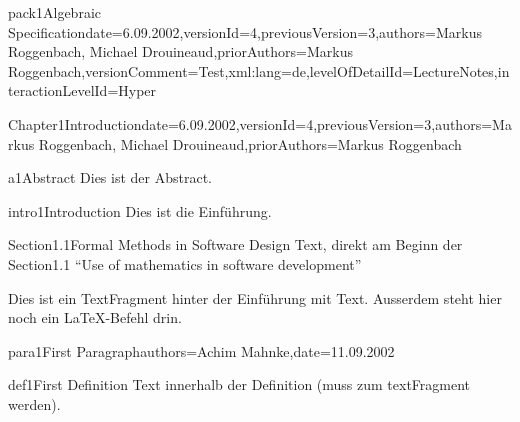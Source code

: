 \documentclass[landscape, slides, light]{mmiss2}
\begin{document}
\begin{Package}{pack1}{Algebraic
Specification}{date=6.09.2002,versionId=4,previousVersion=3,authors={Markus
Roggenbach, Michael Drouineaud},priorAuthors={Markus
Roggenbach},versionComment=Test,xml:lang=de,levelOfDetailId=LectureNotes,interactionLevelId=Hyper}


\begin{Section}{Chapter1}{Introduction}{date=6.09.2002,versionId=4,previousVersion=3,authors={Markus
Roggenbach, Michael Drouineaud},priorAuthors={Markus Roggenbach}}\begin{Abstract}[]{a1}{Abstract}{}
  Dies ist der Abstract.
  \end{Abstract}\begin{Introduction}[]{intro1}{Introduction}{}
    Dies ist die Einf\"uhrung.
  \end{Introduction}

  \begin{Section}{Section1.1}{Formal Methods in Software Design}{}
  Text, direkt am Beginn der Section1.1 
  ``Use of mathematics in software development''\\
  \begin{TextFragment}
  Dies ist ein TextFragment hinter der Einf\"uhrung mit
   Text. Ausserdem steht hier noch
  ein \LaTeX{}-Befehl drin.
  \end{TextFragment}
  \begin{Paragraph}[]{para1}{First Paragraph}{authors=Achim Mahnke,date=11.09.2002}
    \begin{Definition}[]{def1}{First Definition}{}
      Text innerhalb der Definition (muss zum textFragment werden).


\end{Definition}
\end{Paragraph}
\end{Section}
\end{Section}
\end{Package}
\end{document}
